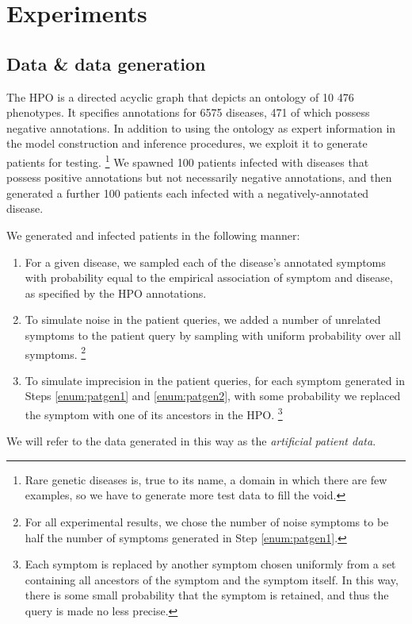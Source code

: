 \section{Experiments}
\label{sec:exp}

\subsection{Data \& data generation}

The HPO \cite{kohler2014hpo} is a directed acyclic graph that depicts an
ontology of 10 476 phenotypes.
%
It specifies annotations for 6575 diseases, 471 of which possess negative
annotations.
%
In addition to using the ontology as expert information in the model
construction and inference procedures, we exploit it to generate patients
for testing.
%
\footnote{
    Rare genetic diseases is, true to its name, a domain in which there are few
    examples, so we have to generate more test data to fill the void.
}
%
We spawned 100 patients infected with diseases that
possess positive annotations but not necessarily negative annotations, and then
generated a further 100 patients each infected with a
negatively-annotated disease.

We generated and infected patients in the following manner:
%
\begin{enumerate}
    \item \label{enum:patgen1}
        For a given disease, we sampled each of the disease's annotated
        symptoms with probability equal to the empirical association of symptom
        and disease, as specified by the HPO annotations.
    \item \label{enum:patgen2}
        To simulate noise in the patient queries, we added a number
        of unrelated symptoms to the patient query by sampling with uniform
        probability over all symptoms.
        \footnote{
            For all experimental results, we chose the number of noise symptoms
            to be half the number of symptoms generated in Step
            \ref{enum:patgen1}.
        }
    \item To simulate imprecision in the patient queries, for each symptom
        generated in Steps \ref{enum:patgen1} and \ref{enum:patgen2}, with some
        probability we replaced the symptom with one of its ancestors in the
        HPO.
        \footnote{
            Each symptom is replaced by another symptom chosen uniformly from a
            set containing all ancestors of the symptom and the symptom itself.
            In this way, there is some small probability that the symptom is
            retained, and thus the query is made no less precise.
        }
\end{enumerate}
%
We will refer to the data generated in this way as the {\it artificial patient
data}.


